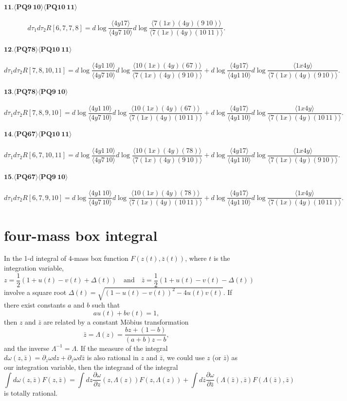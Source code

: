 \documentclass[10pt]{article}
\def\<{\langle}
\def\>{\rangle}
\begin{document}
\paragraph{$\mathbf{11.\<PQ9\ 10\>\<PQ10\ 11\>}$}
\[
    d\tau_1 d\tau_2 R[6,7,7,8]
    =d\log \frac{\<4y17\>}{\<4y7\ 10\>}d\log \frac{\<7(1x)(4y)(9\ 10)\>}{\<7(1x)(4y)(10\ 11)\>}.
\]

\paragraph{$\mathbf{12.\<PQ78\>\<PQ10\ 11\>}$}
\[
    d\tau_1 d\tau_2 R[7,8,10,11]
    =d\log \frac{\<4y1\,10\>}{\<4y7\,10\>}d\log \frac{\<10(1x)(4y)(67)\>}{\<7(1x)(4y)(9\,10)\>}
    +d\log \frac{\<4y17\>}{\<4y1\, 10\>}d\log \frac{\<1x4y\>}{\<7(1x)(4y)(9\,10)\>}.
\]
\paragraph{$\mathbf{13.\<PQ78\>\<PQ9\ 10\>}$}
\[
    d\tau_1 d\tau_2 R[7,8,9,10]
    =d\log \frac{\<4y1\,10\>}{\<4y7\,10\>}d\log \frac{\<10(1x)(4y)(67)\>}{\<7(1x)(4y)(10\,11)\>}
    +d\log \frac{\<4y17\>}{\<4y1\, 10\>}d\log \frac{\<1x4y\>}{\<7(1x)(4y)(10\, 11)\>}.
\]
\paragraph{$\mathbf{14.\<PQ67\>\<PQ10\ 11\>}$}
\[
    d\tau_1 d\tau_2 R[6,7,10,11]
    =d\log \frac{\<4y1\,10\>}{\<4y7\,10\>}d\log \frac{\<10(1x)(4y)(78)\>}{\<7(1x)(4y)(9\,10)\>}
    +d\log \frac{\<4y17\>}{\<4y1\, 10\>}d\log \frac{\<1x4y\>}{\<7(1x)(4y)(9\,10)\>}.
\]
\paragraph{$\mathbf{15.\<PQ67\>\<PQ9\ 10\>}$}
\[
    d\tau_1 d\tau_2 R[6,7,9,10]
    =d\log \frac{\<4y1\,10\>}{\<4y7\,10\>}d\log \frac{\<10(1x)(4y)(78)\>}{\<7(1x)(4y)(10\,11)\>}
    +d\log \frac{\<4y17\>}{\<4y1\, 10\>}d\log \frac{\<1x4y\>}{\<7(1x)(4y)(10\, 11)\>}.
\]

\section{four-mass box integral}
In the 1-d integral of 4-mass box function $F(z(t),\bar z(t))$, where $t$ is the 
integration variable, 
\[
	z=\frac12 (1+u(t)-v(t)+\Delta(t)) \quad \text{and}\quad 
	\bar z=\frac12 (1+u(t)-v(t)-\Delta(t)) 
\]
involve a square root $\Delta(t)=\sqrt{(1-u(t)-v(t))^2-4u(t)v(t)}$. If there exist constants 
$a$ and $b$ such that
\[
	au(t)+bv(t)=1,
\]
then $z$ and $\bar z$ are related by a constant M\"obius transformation
\[
	\bar z=\Lambda(z)=\frac{bz+(1-b)}{(a+b)z-b},
\]
and the inverse $\Lambda^{-1}=\Lambda$. If the measure of the integral $d\omega(z,\bar z)
=\partial_z \omega dz+\partial_{\bar z}\omega d\bar z$
is also rational in $z$ and $\bar z$,
we could use $z$ (or $\bar z$) as our integration variable, then the integrand of the integral
\[
	\int d\omega(z,\bar z) F(z,\bar z) = 
	\int dz \frac{\partial \omega}{\partial z}(z,\Lambda (z))F(z,\Lambda(z))+
	\int d\bar z\frac{\partial \omega}{\partial \bar z}(\Lambda(\bar z),\bar z)
	F(\Lambda(\bar z),\bar z)
\]
is totally rational.
\end{document}
